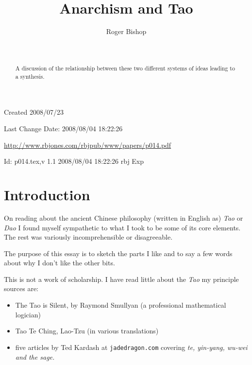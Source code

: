 \documentclass[numreferences]{rbjk}
\def\indexed#1{#1\index{#1}}
\begin{document}
                                                                                   
\begin{article}
\begin{opening}  
\title{Anarchism and Tao}
\author{Roger Bishop }
\date{$ $\ $ $}

\begin{abstract}
A discussion of the relationship between these two different systems of ideas leading to a synthesis.
\end{abstract}

\end{opening}

\vfill

\begin{centering}
\footnotesize{
Created 2008/07/23

Last Change $ $Date: 2008/08/04 18:22:26 $ $

\href{http://www.rbjones.com/rbjpub/www/papers/p014.pdf}{http://www.rbjones.com/rbjpub/www/papers/p014.pdf}

$ $Id: p014.tex,v 1.1 2008/08/04 18:22:26 rbj Exp $ $\\

}%
\end{centering}

\newpage
\setcounter{tocdepth}{4}
{\parskip-0pt\tableofcontents}

\section{Introduction}

On reading about the ancient Chinese philosophy (written in English as) {\it Tao} or {\it Dao} I found myself sympathetic to what I took to be some of its core elements.
The rest was variously incomprehensible or disagreeable.

The purpose of this essay is to sketch the parts I like and to say a few words about why I don't like the other bits.

This is not a work of scholarship.
I have read little about the {\it Tao} my principle sources are:

\begin{itemize}
\item The Tao is Silent\cite{smullyan77}, by Raymond Smullyan (a professional mathematical logician)
\item Tao Te Ching, Lao-Tzu (in various translations)
\item five articles by Ted Kardash at {\tt jadedragon.com} covering \indexed{\it te}, \indexed{\it yin-yang}, \indexed{\it wu-wei} and \indexed{\it the sage}. 
\end{itemize}


\end{article}
\end{document}
